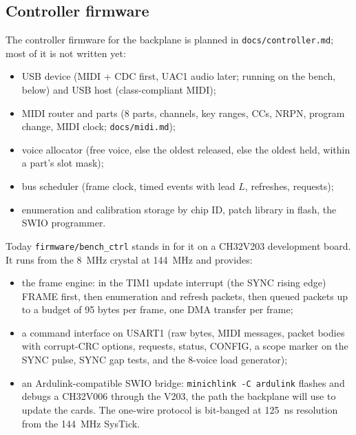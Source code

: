 \documentclass[11pt,a4paper]{article}
\newcommand{\file}[1]{\texttt{#1}}
\begin{document}
\subsection{Controller firmware}
The controller firmware for the backplane is planned in \file{docs/controller.md}; most of it is not written yet:
\begin{itemize}
  \item USB device (MIDI + CDC first, UAC1 audio later; running on the bench, below) and USB host (class-compliant
    MIDI);
  \item MIDI router and parts (8 parts, channels, key ranges, CCs, NRPN, program change, MIDI clock;
    \file{docs/midi.md});
  \item voice allocator (free voice, else the oldest released, else the oldest held, within a part's slot mask);
  \item bus scheduler (frame clock, timed events with lead $L$, refreshes, requests);
  \item enumeration and calibration storage by chip ID, patch library in flash, the SWIO programmer.
\end{itemize}
Today \file{firmware/bench\_ctrl} stands in for it on a CH32V203 development board. It runs from the \SI{8}{MHz}
crystal at \SI{144}{MHz} and provides:
\begin{itemize}
  \item the frame engine: in the TIM1 update interrupt (the SYNC rising edge) FRAME first, then enumeration and refresh
    packets, then queued packets up to a budget of 95 bytes per frame, one DMA transfer per frame;
  \item a command interface on USART1 (raw bytes, MIDI messages, packet bodies with corrupt-CRC options, requests,
    status, CONFIG, a scope marker on the SYNC pulse, SYNC gap tests, and the 8-voice load generator);
  \item an Ardulink-compatible SWIO bridge: \texttt{minichlink -C ardulink} flashes and debugs a CH32V006 through the
    V203, the path the backplane will use to update the cards. The one-wire protocol is bit-banged at \SI{125}{ns}
    resolution from the \SI{144}{MHz} SysTick.
\end{itemize}
\end{document}
